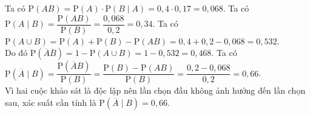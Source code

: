 \begin{ex}
{		\begin{itemchoice}
			\itemch 
			Ta có $\mathrm{P}(AB)=\mathrm{P}(A)\cdot \mathrm{P}(B\mid A)=0{,}4\cdot 0{,}17=0{,}068$.
			\itemch 
			Ta có $\mathrm{P}(A\mid B)=\dfrac{\mathrm{P}(AB)}{\mathrm{P}(B)}=\dfrac{0{,}068}{0{,}2}=0{,}34$.
			\itemch 
			Ta có $\mathrm{P}(A\cup B)=\mathrm{P}(A)+\mathrm{P}(B)-\mathrm{P}(AB)=0{,}4+0{,}2-0{,}068=0{,}532$.\\
			Do đó $\mathrm{P}(\overline{A}\overline{B})=1-\mathrm{P}(A\cup B)=1-0{,}532=0{,}468$.
			\itemch
			Ta có $\mathrm{P}(\overline{A}\mid B)=\dfrac{\mathrm{P}(\overline{A}B)}{\mathrm{P}(B)}=\dfrac{\mathrm{P}(B)-\mathrm{P}(AB)}{\mathrm{P}(B)}=\dfrac{0{,}2-0{,}068}{0{,}2}=0{,}66$.\\
			Vì hai cuộc khảo sát là độc lập nên lần chọn đầu không ảnh hưởng đến lần chọn sau, xác suất cần tính là $\mathrm{P}(\overline{A}\mid B)=0{,}66$.
		\end{itemchoice}
	}
\end{ex}

